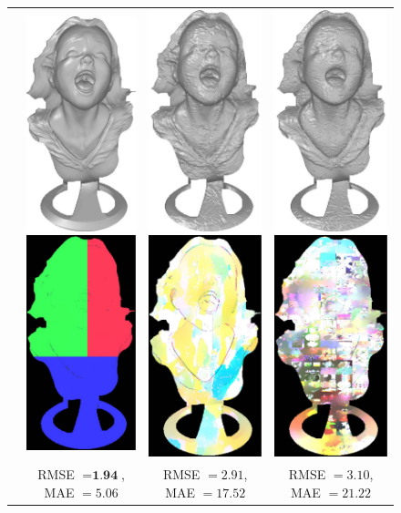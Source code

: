 \begin{figure}[H]
{\begin{tabular}{cccc}
\multirow{-15}{*}{\parbox[t]{2.5mm}{}} &    
 \includegraphics[height=0.25\linewidth]{figures/result/comp_ratio_rgb_shape.pdf}
 \includegraphics[height=0.25\linewidth]{figures/result/comp_ratio_rgb_albedo.pdf} &
 \includegraphics[height=0.25\linewidth]{figures/result/comp_ratio_pattern_shape.pdf} 
\includegraphics[height=0.25\linewidth]{figures/result/comp_ratio_pattern_albedo.pdf} &
\includegraphics[height=0.25\linewidth]{figures/result/comp_ratio_love_shape.pdf} 
\includegraphics[height=0.25\linewidth]{figures/result/comp_ratio_love_albedo.pdf} \\
& {\small RMSE $= \textbf{1.94}$, MAE $=5.06$} & {\small RMSE $= 2.91$, MAE $=17.52$} & {\small RMSE $= 3.10$, MAE $=21.22$} \\


\end{tabular}}
\end{figure}

